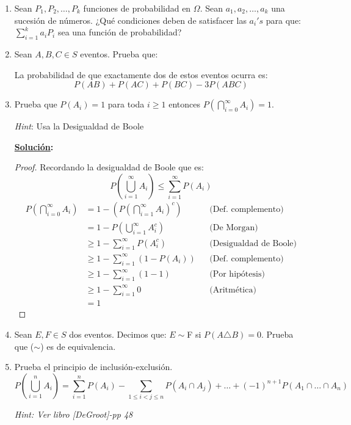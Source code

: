 \documentclass[11pt,letterpaper]{report}
\newcommand{\sol}{\textbf{\underline{Solución}: }} %
\begin{document}
\begin{enumerate}
\sol TODO

\item Sean $P_1, P_2, \ldots, P_k$ funciones de probabilidad en $\Omega$. Sean
$a_1, a_2, \ldots, a_k$ una sucesión de números. ¿Qué condiciones deben de satisfacer las
$a_i's$ para que: $\sum_{i=1}^{k} a_i P_i$ sea una función de probabilidad?

\item Sean $A,B,C \in S$ eventos. Prueba que:

La probabilidad de que exactamente dos de estos eventos ocurra es:
\[
    P(AB) + P(AC) + P(BC) - 3P(ABC)
\]

\item Prueba que $P(A_i) = 1$ para toda $i \geq 1$ entonces $P(\bigcap_{i=0}^{\infty} A_i) = 1$.

\textit{Hint}: Usa la Desigualdad de Boole

\sol \begin{proof}
    Recordando la desigualdad de Boole que es:
    \[
        P(\bigcup_{i=1}^{\infty} A_i) \leq \sum_{i=1}^{\infty} P(A_i)
    \]
\begin{align*}
    P(\bigcap_{i=0}^{\infty} A_i)
        &= 1 - (P(\bigcap_{i=1}^{\infty} A_i)^c) && \text{(Def. complemento)}\\
        &= 1 - P(\bigcup_{i=1}^{\infty} A_i^c) && \text{(De Morgan)}\\
        &\geq 1 - \sum_{i=1}^{\infty} P(A_i^c) && \text{(Desigualdad de Boole)}\\
        &\geq 1 - \sum_{i=1}^{\infty} (1 - P(A_i)) && \text{(Def. complemento)}\\
        &\geq 1 - \sum_{i=1}^{\infty} (1 - 1) && \text{(Por hipótesis)}\\
        &\geq 1 - \sum_{i=1}^{\infty} 0 && \text{(Aritmética)}\\
        &= 1
\end{align*}
\end{proof}

\item Sean $E,F \in S$ dos eventos. Decimos que: $E \sim $F si $P(A \triangle B) = 0$.
Prueba que ($\sim$) es de equivalencia.

\item Prueba el principio de inclusión-exclusión.
\[
    P(\bigcup_{i=1}^{n} A_i) = \sum_{i=1}^{n} P(A_i) - \sum_{1 \leq i < j \leq n } P(A_i \cap A_j)
    + \ldots + (-1)^{n+1} P(A_1 \cap \ldots \cap A_n) \tag{$\heartsuit$}
\]

\textit{Hint: Ver libro [DeGroot]-pp 48}


\end{enumerate}
\end{document}
